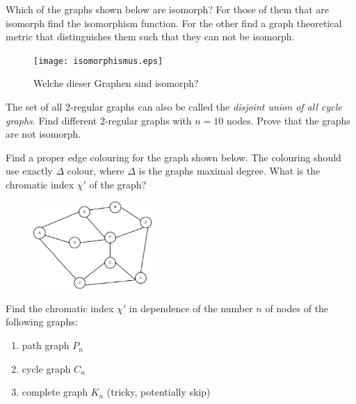\exercise[%
  topic = Graph isomorphism 
    ]
		
		\subexercise[%
  topic=Check the isomorphism between graphs,
    ]
		
		
Which of the graphs shown below are isomorph? For those of them that are isomorph find the isomorphism function. For the other find a graph theoretical metric that distinguishes them such that they can not be isomorph.		
		
\begin{figure}[h]
    \centering
    \texttt{[image: isomorphismus.eps]}
    \caption{\label{isomorphismus} Welche dieser Graphen sind isomorph?}
\end{figure}

\subexercise[%
  topic=2-regular Graphs,
    ]

The set of all 2-regular graphs can also be called the \emph{disjoint union of all cycle graphs}. Find different 2-regular graphs with $n=10$ nodes. Prove that the graphs are not isomorph.
    
    
\clearpage 
\exercise[%
  topic =Edge Colouring 
    ]

\subexercise[%
  topic=Edge Colouring of a Graph,
    ]

Find a proper edge colouring for the graph shown below. The colouring should use exactly $\Delta$ colour, where $\Delta$ is the graphs maximal degree. What is the chromatic index $\chi'$ of the graph?

\begin{figure}[h]
\includegraphics[width=0.4\textwidth]{graph_colouring.eps}
\end{figure}

\subexercise[%
  topic=Edge colouring of Graph Models,
    ]

Find the  chromatic index  $\chi'$ in dependence of the number $n$ of nodes of the following graphs:   

\begin{enumerate}
\item path graph $P_n$
\item cycle graph $C_n$
\item complete graph $K_n$ (tricky, potentially skip)
\end{enumerate}


